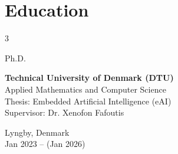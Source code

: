 \documentclass[10pt, letterpaper]{article}
\newenvironment{threecolentry}[3][]{
    \onecolentry
    \def\thirdColumn{#3}
    \setcolumnwidth{1 cm, \fill, 4.5 cm}
    \begin{paracol}{3}
    {\raggedright #2} \switchcolumn
}{
    \switchcolumn \raggedleft \thirdColumn
    \end{paracol}
    \endonecolentry
} %
\begin{document}
        
        
        
        

    
    \vspace{0.3 cm - 0.3 cm}


    \section{Education}
        
        \begin{threecolentry}{Ph.D.}{
            Lyngby, Denmark\\
            Jan 2023 – (Jan 2026)
        }
            \textbf{Technical University of Denmark (DTU)}\\
            Applied Mathematics and Computer Science\\
            Thesis: Embedded Artificial Intelligence (eAI)\\
            Supervisor: Dr. Xenofon Fafoutis
        \end{threecolentry}
        
\end{document}
